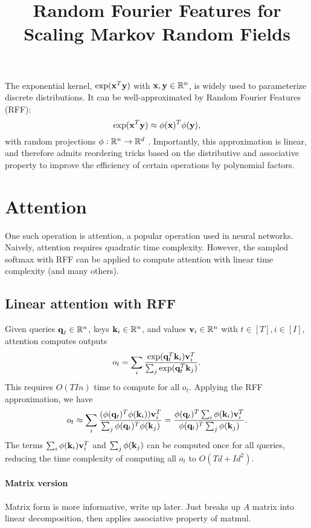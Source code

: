 \documentclass{article}
\title{Random Fourier Features for Scaling Markov Random Fields}
\begin{document}
\maketitle

The exponential kernel, $\exp(\mathbf{x}^T\mathbf{y})$ with $\mathbf{x},\mathbf{y}\in\mathbb{R}^n$,
is widely used to parameterize discrete distributions.
It can be well-approximated by Random Fourier Features
(RFF):
\begin{equation}
\exp(\mathbf{x}^T\mathbf{y})\approx \phi(\mathbf{x})^T\phi(\mathbf{y}),
\end{equation}
with random projections $\phi:\mathbb{R}^n\to\mathbb{R}^d$ \citep{rawat2019linearizedsoftmax}.
Importantly, this approximation is linear, and therefore admits
reordering tricks based on the distributive and associative property
to improve the efficiency of certain operations by polynomial factors.

\section{Attention}
One such operation is attention, a popular operation used in neural networks.
Naively, attention requires quadratic time complexity.
However, the sampled softmax with RFF \citep{rawat2019linearizedsoftmax}
can be applied to compute attention with linear time complexity
\citep{choromanski2020rethinking} (and many others).

\subsection{Linear attention with RFF}
Given queries $\mathbf{q}_j\in\mathbb{R}^n$, keys $\mathbf{k}_i\in\mathbb{R}^n$, and values $\mathbf{v}_i\in\mathbb{R}^n$ with $t\in[T],i\in[I]$,
attention computes outputs
\begin{equation}
o_t = \sum_i \frac{\exp(\mathbf{q}_t^T\mathbf{k}_i)\mathbf{v}_i^T}{\sum_j \exp(\mathbf{q}_t^T\mathbf{k}_j)}.
\end{equation}
This requires $O(TIn)$ time to compute for all $o_t$.
Applying the RFF approximation, we have
\begin{equation}
o_t \approx \sum_i \frac{(\phi(\mathbf{q}_t)^T\phi(\mathbf{k}_i))\mathbf{v}_i^T}{\sum_j\phi(\mathbf{q}_t)^T\phi(\mathbf{k}_j)}
= \frac{\phi(\mathbf{q}_t)^T\sum_i\phi(\mathbf{k}_i)\mathbf{v}_i^T}{\phi(\mathbf{q}_t)^T\sum_j\phi(\mathbf{k}_j)}.
\end{equation}
The terms $\sum_i\phi(\mathbf{k}_i)\mathbf{v}_i^T$ and $\sum_j\phi(\mathbf{k}_j)$ can be computed once for all queries,
reducing the time complexity of computing all $o_t$ to $O(Td+Id^2)$.

\paragraph{Matrix version}
Matrix form \citep{choromanski2020rethinking} is more informative, write up later.
Just breaks up $A$ matrix into linear decomposition,
then applies associative property of matmul.
\end{document}
